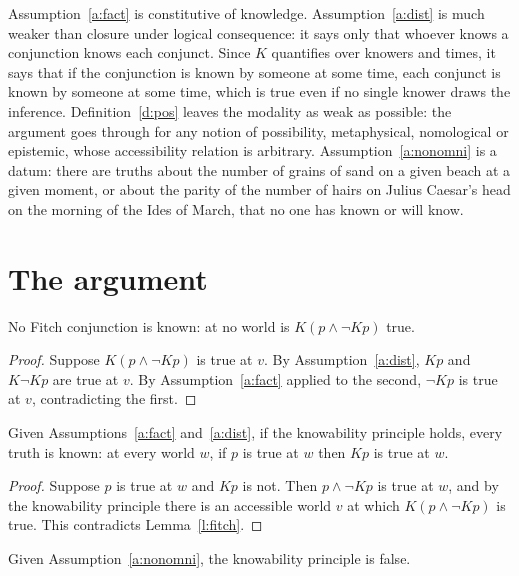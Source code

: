 \documentclass{situationist-preprint}
\begin{document}
Assumption~\ref{a:fact} is constitutive of knowledge. Assumption~\ref{a:dist} is much weaker than closure under logical consequence: it says only that whoever knows a conjunction knows each conjunct. Since $K$ quantifies over knowers and times, it says that if the conjunction is known by someone at some time, each conjunct is known by someone at some time, which is true even if no single knower draws the inference. Definition~\ref{d:pos} leaves the modality as weak as possible: the argument goes through for any notion of possibility, metaphysical, nomological or epistemic, whose accessibility relation is arbitrary. Assumption~\ref{a:nonomni} is a datum: there are truths about the number of grains of sand on a given beach at a given moment, or about the parity of the number of hairs on Julius Caesar's head on the morning of the Ides of March, that no one has known or will know.

\section{The argument}

\begin{lemma}\label{l:fitch}
No Fitch conjunction is known: at no world is $K(p \wedge \neg Kp)$ true.
\end{lemma}

\begin{proof}
Suppose $K(p \wedge \neg Kp)$ is true at $v$. By Assumption~\ref{a:dist}, $Kp$ and $K\neg Kp$ are true at $v$. By Assumption~\ref{a:fact} applied to the second, $\neg Kp$ is true at $v$, contradicting the first.
\end{proof}

\begin{theorem}[Fitch]\label{t:fitch}
Given Assumptions~\ref{a:fact} and~\ref{a:dist}, if the knowability principle holds, every truth is known: at every world $w$, if $p$ is true at $w$ then $Kp$ is true at $w$.
\end{theorem}

\begin{proof}
Suppose $p$ is true at $w$ and $Kp$ is not. Then $p \wedge \neg Kp$ is true at $w$, and by the knowability principle there is an accessible world $v$ at which $K(p \wedge \neg Kp)$ is true. This contradicts Lemma~\ref{l:fitch}.
\end{proof}

\begin{corollary}\label{c:fails}
Given Assumption~\ref{a:nonomni}, the knowability principle is false.
\end{corollary}
\end{document}
